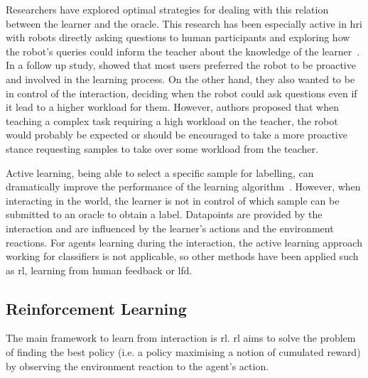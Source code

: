 Researchers have explored optimal strategies for dealing with this relation between the learner and the oracle. This research has been especially active in \gls{hri} with robots directly asking questions to human participants and exploring how the robot's queries could inform the teacher about the knowledge of the learner~\citep{chao2010transparent}. In a follow up study, \cite{cakmak2010designing} showed that most users preferred the robot to be proactive and involved in the learning process. On the other hand, they also wanted to be in control of the interaction, deciding when the robot could ask questions even if it lead to a higher workload for them. However, authors proposed that when teaching a complex task requiring a high workload on the teacher, the robot would probably be expected or should be encouraged to take a more proactive stance requesting samples to take over some workload from the teacher.

Active learning, being able to select a specific sample for labelling, can dramatically improve the performance of the learning algorithm~\citep{settles2012active}. However, when interacting in the world, the learner is not in control of which sample can be submitted to an oracle to obtain a label. Datapoints are provided by the interaction and are influenced by the learner's actions and the environment reactions. For agents learning during the interaction, the active learning approach working for classifiers is not applicable, so other methods have been applied such as \gls{rl}, learning from human feedback or \gls{lfd}.

\subsection{Reinforcement Learning} \label{ssec:back_rl}

The main framework to learn from interaction is \acrfull{rl}. \gls{rl} aims to solve the problem of finding the best policy (i.e. a policy maximising a notion of cumulated reward) by observing the environment reaction to the agent's action.

